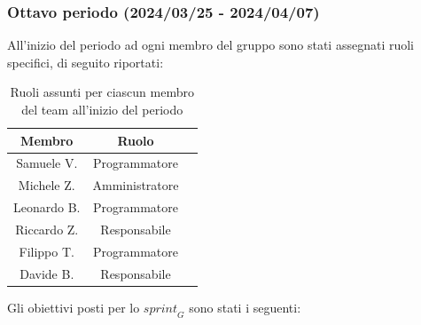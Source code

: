 \subsubsection{Ottavo periodo (2024/03/25 - 2024/04/07)}
All'inizio del periodo ad ogni membro del gruppo sono stati assegnati ruoli specifici, di seguito riportati:
\begin{table}[H]
\centering
\begin{tabular}{|c|c|c|}
\hline
\textbf{Membro} & \textbf{Ruolo} \\
\hline
Samuele V. & Programmatore \\
\hline
Michele Z. & Amministratore \\
\hline
Leonardo B. & Programmatore \\
\hline
Riccardo Z. & Responsabile \\
\hline
Filippo T. & Programmatore \\
\hline
Davide B. & Responsabile \\
\hline
\end{tabular}
\caption{Ruoli assunti per ciascun membro del team all'inizio del periodo}
\end{table}
Gli obiettivi posti per lo $\textit{sprint}_G$ sono stati i seguenti:
